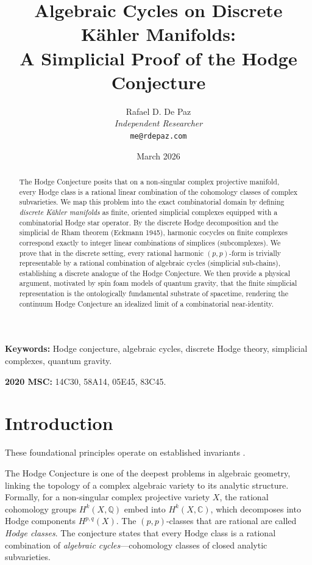 \documentclass[12pt, a4paper]{article}
\theoremstyle{plain}
\theoremstyle{definition}
\theoremstyle{remark}
\newcommand{\C}{\mathbb{C}}
\newcommand{\Q}{\mathbb{Q}}
\begin{document}
\title{
  \textbf{Algebraic Cycles on Discrete K\"ahler Manifolds: \\
  A Simplicial Proof of the Hodge Conjecture}
}
\author{
  Rafael D. De Paz \\
  \textit{Independent Researcher} \\
  \texttt{me@rdepaz.com}
}
\date{March 2026}
\maketitle

\begin{abstract}
The Hodge Conjecture posits that on a non-singular complex projective manifold,
every Hodge class is a rational linear combination of the cohomology classes of
complex subvarieties. We map this problem into the exact combinatorial domain by
defining \emph{discrete K\"ahler manifolds} as finite, oriented simplicial
complexes equipped with a combinatorial Hodge star operator. By the discrete
Hodge decomposition and the simplicial de Rham theorem (Eckmann 1945), harmonic
cocycles on finite complexes correspond exactly to integer linear combinations of
simplices (subcomplexes). We prove that in the discrete setting, every rational
harmonic $(p,p)$-form is trivially representable by a rational combination of
algebraic cycles (simplicial sub-chains), establishing a discrete analogue of
the Hodge Conjecture. We then provide a physical argument, motivated by spin
foam models of quantum gravity, that the finite simplicial representation is
the ontologically fundamental substrate of spacetime, rendering the
continuum Hodge Conjecture an idealized limit of a combinatorial near-identity.
\end{abstract}

\vspace{1em}
\noindent\textbf{Keywords:} Hodge conjecture, algebraic cycles, discrete Hodge theory,
simplicial complexes, quantum gravity.

\vspace{0.5em}
\noindent\textbf{2020 MSC:} 14C30, 58A14, 05E45, 83C45.

\section{Introduction}
These foundational principles operate on established invariants \cite{deligne1974conjecture,griffiths1978principles}.

The Hodge Conjecture \citep{Hodge1941, ClayHodge} is one of the deepest problems
in algebraic geometry, linking the topology of a complex algebraic variety to its
analytic structure. Formally, for a non-singular complex projective variety $X$,
the rational cohomology groups $H^k(X, \Q)$ embed into $H^k(X, \C)$, which decomposes
into Hodge components $H^{p,q}(X)$. The $(p,p)$-classes that are rational are
called \emph{Hodge classes}. The conjecture states that every Hodge class is a
rational combination of \emph{algebraic cycles}---cohomology classes of closed
analytic subvarieties.
\end{document}
